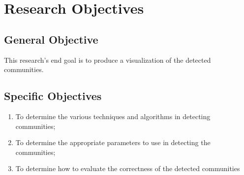 \begin{comment}
The following are references from journal articles \cite{Lancichinetti:2011}.  Here's an MS thesis document \cite{Lim:2012:0}, and this is from
PhD dissertation \cite{Lim:2012:1}. For a book, reference is given as 
\cite{Papadopoulos:2012}.  Proceedings from a conference samples are \cite{Pearce:2014}.  The sample bibliography file named \textbf{myreferences.bib} is from the
SIGGRAPH \LaTeX template.  You can use a text editor to view the contents of the bib file.  
It is your task to create your own bibliography file.  For those who downloaded papers from
ACM or IEEE sites, there is a BibTeX link that you can click; thereafter, you just simply need
to copy and paste the BibTeX entry into your own bibliography file.



The following shows how to include a program source code (or algorithm).  The verbatim environment,\cite{West:2014,Xie:2012,Zhang:2012}
as the name suggests, outputs text (including white spaces) as is...

\begin{verbatim}
#include <stdio.h>
main()
{
printf("Hello world!\n");
}
\end{verbatim}


\textcolor{red}{DO NOT FORGET to write the statement of the research problem here, i.e.,
before the Research Objectives.}
\end{comment}


\section{Research Objectives}
\label{sec:researchobjectives}

\subsection{General Objective}
\label{sec:generalobjective}

This research's end goal is to produce a visualization of the detected communities.


\subsection{Specific Objectives}
\label{sec:specificobjectives}

\begin{enumerate}
	\item To determine the various techniques and algorithms in detecting communities;
	\item To determine the appropriate parameters to use in detecting the communities;
	\item To determine how to evaluate the correctness of the detected communities
\end{enumerate}

